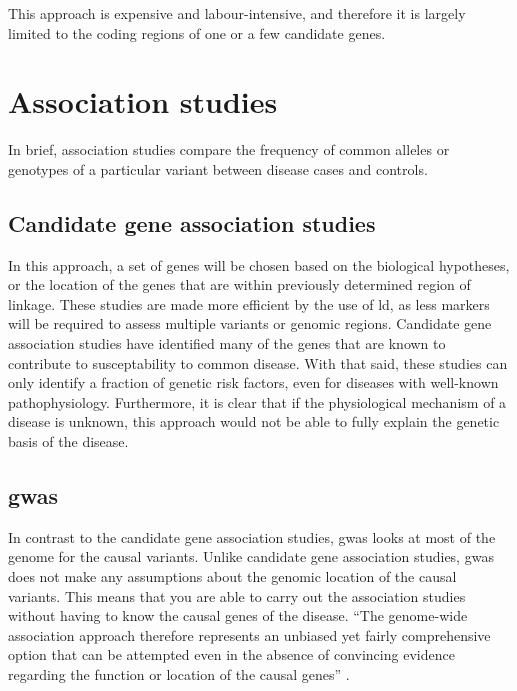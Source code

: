 This approach is expensive and labour-intensive, and therefore it is largely limited to the coding regions of one or a few candidate genes.

\section{Association studies}
\label{sec:association_studies}

In brief, association studies compare the frequency of common alleles or genotypes of  a particular variant between disease cases and controls.

\subsection{Candidate gene association studies}
\label{sub:candidate_gene_association_studies}

In this approach, a set of genes will be chosen based on the biological hypotheses, or the location of the genes that are within previously determined region of linkage.
These studies are made more efficient by the use of \gls{ld}, as less markers will be required to assess multiple variants or genomic regions.
Candidate gene association studies have identified many of the genes that are known to contribute to susceptability to common disease.
With that said, these studies can only identify  a fraction of genetic risk factors, even for diseases with well-known pathophysiology.
Furthermore, it is clear that if the physiological mechanism of a disease is unknown, this approach would not be able to fully explain the genetic basis of the disease.

\subsection{\Acrfull{gwas}}
\label{sub:gwas}

In contrast to the candidate gene association studies, \gls{gwas} looks at most of the genome for the causal variants.
Unlike candidate gene association studies, \gls{gwas} does not make any assumptions about the genomic location of the causal variants.
This means that you are able to carry out the association studies without having to know the causal genes of the disease.
``The genome-wide association approach therefore represents an unbiased yet fairly comprehensive option that can be attempted even in the absence of convincing evidence regarding the function or location of the causal genes'' \citep{Hirschhorn2005}.


















